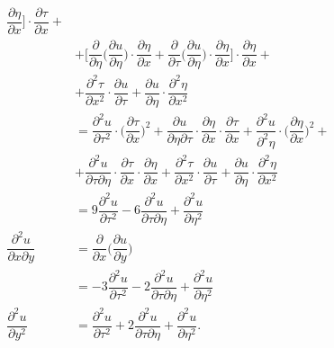 \begin{align*}
                                   \dfrac{\partial \eta}{\partial x} \Big] \cdot \dfrac{\partial \tau}{\partial x} + \\
                                 &+ \Big[ \dfrac{\partial}{\partial \eta} \Big(\dfrac{\partial u}{\partial \eta}\Big) \cdot %
                                   \dfrac{\partial \eta}{\partial x} + \dfrac{\partial}{\partial \tau} \Big(\dfrac{\partial u}{\partial \eta}\Big) \cdot %
                                   \dfrac{\partial \eta}{\partial x} \Big] \cdot \dfrac{\partial \eta}{\partial x} + \\
                                 &+ \dfrac{\partial^2 \tau}{\partial x^2} \cdot \dfrac{\partial u}{\partial \tau} + %
                                   \dfrac{\partial u}{\partial \eta} \cdot \dfrac{\partial^2 \eta}{\partial x^2} \\
                                 &= \dfrac{\partial^2 u}{\partial \tau^2} \cdot \Big( \dfrac{\partial \tau}{\partial x} \Big)^2 + %
                                   \dfrac{\partial u}{\partial \eta \partial \tau} \cdot \dfrac{\partial \eta}{\partial x} \cdot \dfrac{\partial \tau}{\partial x} + %
                                   \dfrac{\partial^2 u}{\partial^2 \eta} \cdot \Big( \dfrac{\partial \eta}{\partial x} \Big)^2 + \\
                                 &+ \dfrac{\partial^2 u}{\partial \tau\partial \eta} \cdot \dfrac{\partial \tau}{\partial x} \cdot \dfrac{\partial \eta}{\partial x} + %
                                   \dfrac{\partial^2 \tau}{\partial x^2} \cdot \dfrac{\partial u}{\partial \tau} + \dfrac{\partial u}{\partial \eta} \cdot %
                                   \dfrac{\partial^2 \eta}{\partial x^2} \\
                                 &= 9 \dfrac{\partial^2 u}{\partial \tau^2} - %
                                   6 \dfrac{\partial^2 u}{\partial \tau \partial \eta} + %
                                   \dfrac{\partial^2 u}{\partial \eta^2} \\
  \dfrac{\partial^2 u}{\partial x \partial y} &= \dfrac{\partial}{\partial x}\Big( \dfrac{\partial u}{\partial y} \Big)\\
                                 &= -3\dfrac{\partial^2 u}{\partial \tau^2} - %
                                   2 \dfrac{\partial ^2 u}{\partial \tau \partial \eta} + %
                                   \dfrac{\partial^2 u}{\partial \eta^2} \\
  \dfrac{\partial^2 u}{\partial y^2} &= \dfrac{\partial^2 u}{\partial \tau^2} + %
                                       2 \dfrac{\partial^2 u}{\partial \tau \partial \eta} + %
                                       \dfrac{\partial^2 u}{\partial \eta^2}.  
\end{align*}

